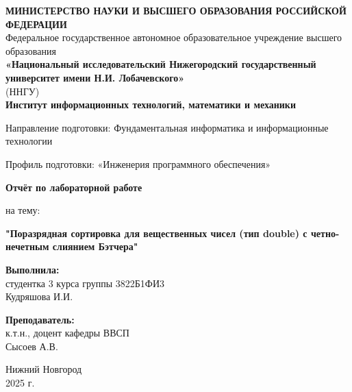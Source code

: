 \documentclass[12pt,a4paper]{extarticle}
\begin{document}
	
	\begin{titlepage}
		\begin{center}
			
			\onehalfspacing
			
			\begin{center}
				\textbf{МИНИСТЕРСТВО НАУКИ И ВЫСШЕГО ОБРАЗОВАНИЯ РОССИЙСКОЙ ФЕДЕРАЦИИ} \\ 			
				\vspace{0.5cm}
				Федеральное государственное автономное образовательное учреждение высшего образования \\ 
				\vspace{0.5cm}
				\textbf{«Национальный исследовательский Нижегородский государственный университет имени Н.И. Лобачевского»} \\
				(ННГУ)\\
				\vspace{0.5cm}
				\textbf{Институт информационных технологий, математики и механики}
			\end{center}
			\vspace{0.5cm}
			\begin{center}
			Направление подготовки: Фундаментальная информатика и информационные технологии
			
			
			Профиль подготовки: «Инженерия программного обеспечения»
			\end{center}
			\vspace{2.5cm}
			\begin{center}
				\textbf{Отчёт по лабораторной работе}

				на тему: 
				
				\textbf{"Поразрядная сортировка для вещественных чисел (тип double) с четно-нечетным слиянием Бэтчера"}
			\end{center}
			
			\vspace{2.5cm}
			
			\begin{flushright}
				\textbf{Выполнила:} \\
				студентка 3 курса группы 3822Б1ФИ3 \\
				Кудряшова И.И. \\
				
				\vspace{1cm}
				
			\noindent\textbf{Преподаватель:} \\
			к.т.н., доцент кафедры ВВСП \\
			{Сысоев А.В.}
			\end{flushright}
			
			\vspace{2em}
			
			\vfill
			
			\begin{center}
				Нижний Новгород \\
				2025 г.
			\end{center}
			
		\end{center}
	\end{titlepage}
	
\end{document}
